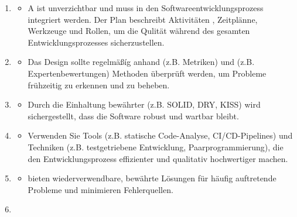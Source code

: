 \begin{infoBox}
    \begin{enumerate}
        \item {}
        \begin{itemize}
            \item A  ist unverzichtbar und muss in den Softwareentwicklungsprozess integriert werden. Der Plan beschreibt Aktivitäten , Zeitplänne, Werkzeuge und Rollen, um die Qulität während des gesamten Entwicklungsprozesses sicherzustellen.
        \end{itemize}
        \item {}
        \begin{itemize}
            \item Das Design sollte regelmäßíg anhand  (z.B. Metriken) und  (z.B. Expertenbewertungen) Methoden überprüft werden, um Probleme frühzeitig zu erkennen und zu beheben.
        \end{itemize}
        \item {}
        \begin{itemize}
            \item Durch die Einhaltung bewährter  (z.B. SOLID, DRY, KISS) wird sichergestellt, dass die Software robust und wartbar bleibt.
        \end{itemize}
        \item {}
        \begin{itemize}
            \item Verwenden Sie Tools (z.B. statische Code-Analyse, CI/CD-Pipelines) und Techniken (z.B. testgetriebene Entwicklung, Paarprogrammierung), die den Entwicklungsprozess effizienter und qualitativ hochwertiger machen.
        \end{itemize}
        \item {}
        \begin{itemize}
            \item {} bieten wiederverwendbare, bewährte Lösungen für häufig auftretende Probleme und minimieren Fehlerquellen.
        \end{itemize}
        \item {}
        \begin{itemize}

\end{itemize}
\end{enumerate}
\end{infoBox}
